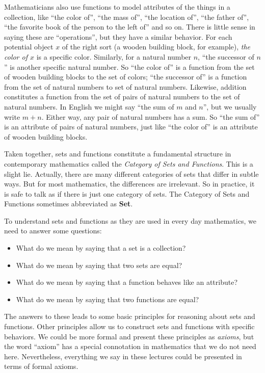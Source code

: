 Mathematicians also use functions to model attributes of the things in a collection, like ``the color of'', ``the mass of'', ``the location of'', ``the father of'', ``the favorite book of the person to the left of'' and so on.
There is little sense in saying these are ``operations'', but they have a similar behavior. For each potential
object $x$ of the right sort (a wooden building block, for example), \emph{the color of $x$} is a specific color. Similarly,
for a natural number $n$, ``the successor of $n$'' is another specific natural number. So ``the color of'' is a function
from the set of wooden building blocks to the set of colors; ``the successor of''
is a function from the set of natural numbers to set of natural numbers. Likewise, addition constitutes a function from the set of 
pairs of natural numbers to the set of natural numbers. In English we might say ``the sum of $m$ and $n$'', but we usually write $m+n$. 
Either way, any pair of natural numbers has a sum. So ``the sum of'' is an attribute of pairs of natural numbers, just like ``the color of'' is an attribute of wooden building blocks.

Taken together, sets and functions constitute a fundamental structure in contemporary mathematics called the \emph{Category of Sets and Functions}. 
This is a slight lie.
Actually, there are many different categories of sets that differ in subtle ways. 
But for most mathematics, the differences are irrelevant.
So in practice, it is safe to talk as if there is just one category of sets.
The Category of Sets and Functions sometimes abbreviated as \textbf{Set}.

To understand sets and functions as they are used in every day mathematics, we need to answer some questions:
\begin{itemize}
	\item What do we mean by saying that a set is a collection?
	\item What do we mean by saying that two sets are equal?
	\item What do we mean by saying that a function behaves like an attribute?
	\item What do we mean by saying that two functions are equal?
\end{itemize}
The answers to these leads to some basic principles for reasoning about sets and functions. 
Other principles allow us to construct sets and functions with specific behaviors. 
We could be more formal and present these principles as \emph{axioms}, but the word ``axiom''
has a special connotation in mathematics that we do not need here. Nevertheless, everything we say in these lectures could be presented in terms of formal axioms.  

